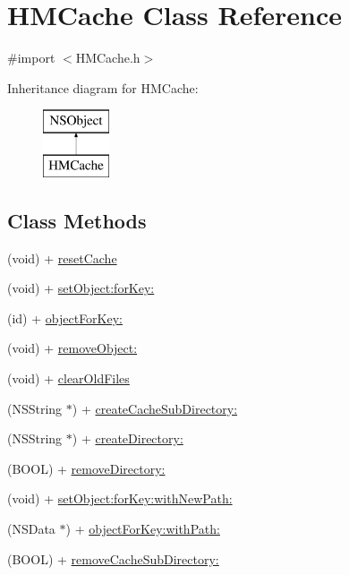 \hypertarget{interface_h_m_cache}{\section{H\-M\-Cache Class Reference}
\label{interface_h_m_cache}
}


{\ttfamily \#import $<$H\-M\-Cache.\-h$>$}

Inheritance diagram for H\-M\-Cache\-:\begin{figure}[H]
\begin{center}
\leavevmode
\includegraphics[height=2.000000cm]{interface_h_m_cache}
\end{center}
\end{figure}
\subsection*{Class Methods}
\begin{DoxyCompactItemize}
\item 
(void) + \hyperlink{interface_h_m_cache_a6bdf784a54d7769ecd74ede7e3144b97}{reset\-Cache}
\item 
(void) + \hyperlink{interface_h_m_cache_a8608ca43aaceb46957be9651133b0ca2}{set\-Object\-:for\-Key\-:}
\item 
(id) + \hyperlink{interface_h_m_cache_a129a4f9b8f97fe5d6d91c4b40ce2cf12}{object\-For\-Key\-:}
\item 
(void) + \hyperlink{interface_h_m_cache_a94647093b59901a003c740cb60d0b503}{remove\-Object\-:}
\item 
(void) + \hyperlink{interface_h_m_cache_ae93bd9319423f1567d93d621563207a5}{clear\-Old\-Files}
\item 
(N\-S\-String $\ast$) + \hyperlink{interface_h_m_cache_afbf507c62ac548dc5d622ccf9c5677f5}{create\-Cache\-Sub\-Directory\-:}
\item 
(N\-S\-String $\ast$) + \hyperlink{interface_h_m_cache_a645cab7afdf3ba10c051e4bb2176d2a2}{create\-Directory\-:}
\item 
(B\-O\-O\-L) + \hyperlink{interface_h_m_cache_a77f18b032b046ab8b6aed93444c777a1}{remove\-Directory\-:}
\item 
(void) + \hyperlink{interface_h_m_cache_aebd9c067580569f1b703e17a96ace2db}{set\-Object\-:for\-Key\-:with\-New\-Path\-:}
\item 
(N\-S\-Data $\ast$) + \hyperlink{interface_h_m_cache_ad8b8bc321146bed180346c14ec284a57}{object\-For\-Key\-:with\-Path\-:}
\item 
(B\-O\-O\-L) + \hyperlink{interface_h_m_cache_aa796cf777c3fb02a18385b4ee47637a5}{remove\-Cache\-Sub\-Directory\-:}
\end{DoxyCompactItemize}


